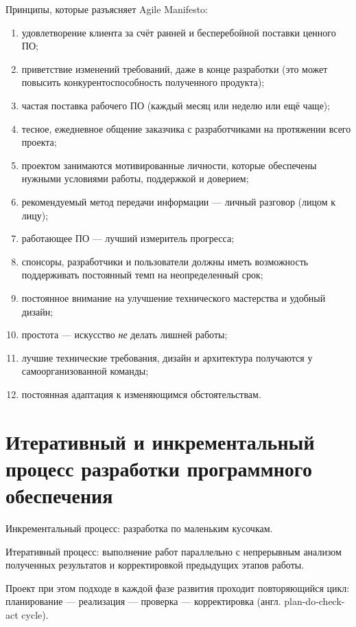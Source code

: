 \documentclass{article}
\let\stdsection\section
\renewcommand\section{\newpage\stdsection}
\begin{document}
    Принципы, которые разъясняет Agile Manifesto:
    \begin{enumerate}
        \item удовлетворение клиента за счёт ранней и бесперебойной поставки ценного ПО;
        \item приветствие изменений требований, даже в конце разработки (это может повысить конкурентоспособность полученного продукта);
        \item частая поставка рабочего ПО (каждый месяц или неделю или ещё чаще);
        \item тесное, ежедневное общение заказчика с разработчиками на протяжении всего проекта;
        \item проектом занимаются мотивированные личности, которые обеспечены нужными условиями работы, поддержкой и доверием;
        \item рекомендуемый метод передачи информации — личный разговор (лицом к лицу);
        \item работающее ПО — лучший измеритель прогресса;
        \item спонсоры, разработчики и пользователи должны иметь возможность поддерживать постоянный темп на неопределенный срок;
        \item постоянное внимание на улучшение технического мастерства и удобный дизайн;
        \item простота — искусство \emph{не} делать лишней работы;
        \item лучшие технические требования, дизайн и архитектура получаются у самоорганизованной команды;
        \item постоянная адаптация к изменяющимся обстоятельствам.
    \end{enumerate}

\section{Итеративный и инкрементальный процесс разработки программного обеспечения}
    Инкрементальный процесс: разработка по маленьким кусочкам.

    Итеративный процесс: выполнение работ параллельно с непрерывным анализом полученных результатов и корректировкой предыдущих этапов работы.

    Проект при этом подходе в каждой фазе развития проходит повторяющийся цикл: планирование — реализация — проверка — корректировка (англ. plan-do-check-act cycle).
\end{document}
